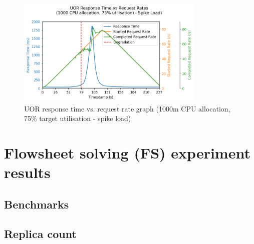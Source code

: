 \begin{figure}[h]
    \centering
    \includegraphics[width=0.8\textwidth]{figures/uor-rau-i7-spike-rt-graph.png}
    \caption{UOR response time vs. request rate graph (1000m CPU allocation, 75\% target utilisation - spike load)}
    \label{figure:uor-resource-allocation-rt-graph-i7-spike}
\end{figure}


\section{Flowsheet solving (FS) experiment results}

\subsection{Benchmarks}


\subsection{Replica count}


